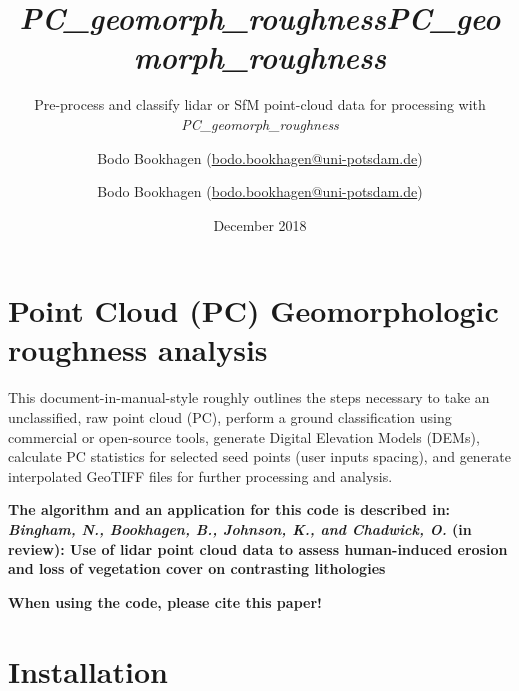 \documentclass[a4paperpaper,,tablecaptionabove]{scrartcl}
\title{\emph{PC\_geomorph\_roughness}}
\subtitle{Pre-process and classify lidar or SfM point-cloud data for processing
with \emph{PC\_geomorph\_roughness}}
\author{Bodo Bookhagen (\url{bodo.bookhagen@uni-potsdam.de})}
\date{December 2018}
\title{\emph{PC\_geomorph\_roughness}}
\author{Bodo Bookhagen (\url{bodo.bookhagen@uni-potsdam.de})}
\begin{document}

\begin{titlepage}
\newcommand{\colorRule}[3][black]{\textcolor[HTML]{#1}{\rule{#2}{#3}}}
\end{titlepage}
\restoregeometry



\renewcommand*\contentsname{Table of Contents}
{
\hypersetup{linkcolor=}
\setcounter{tocdepth}{3}
\tableofcontents
\newpage
}
\hypertarget{point-cloud-pc-geomorphologic-roughness-analysis}{%
\section{Point Cloud (PC) Geomorphologic roughness
analysis}\label{point-cloud-pc-geomorphologic-roughness-analysis}}

This document-in-manual-style roughly outlines the steps necessary to
take an unclassified, raw point cloud (PC), perform a ground
classification using commercial or open-source tools, generate Digital
Elevation Models (DEMs), calculate PC statistics for selected seed
points (user inputs spacing), and generate interpolated GeoTIFF files
for further processing and analysis.

\textbf{The algorithm and an application for this code is described in:
\emph{Bingham, N., Bookhagen, B., Johnson, K., and Chadwick, O.} (in
review): Use of lidar point cloud data to assess human-induced erosion
and loss of vegetation cover on contrasting lithologies}

\textbf{When using the code, please cite this paper!}

\hypertarget{installation}{%
\section{Installation}\label{installation}}
\end{document}
